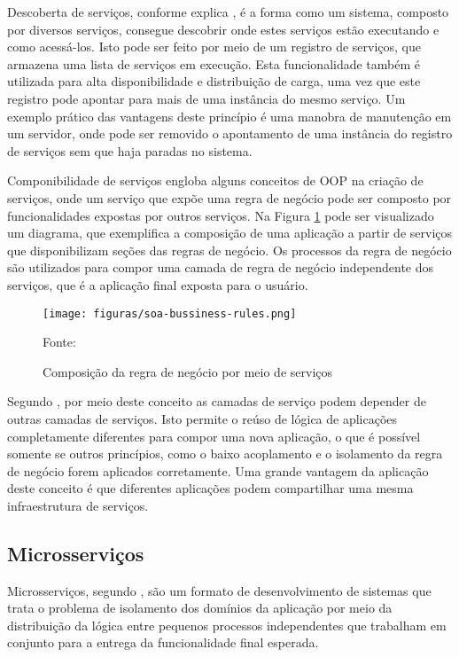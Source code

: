 Descoberta de serviços, conforme explica , é a
forma como um sistema, composto por diversos serviços, consegue descobrir onde
estes serviços estão executando e como acessá-los. Isto pode ser feito por
meio de um registro de serviços, que armazena uma lista de serviços
em execução. Esta funcionalidade também é utilizada para alta
disponibilidade e distribuição de carga, uma vez que este registro pode
apontar para mais de uma instância do mesmo serviço. Um exemplo prático das
vantagens deste princípio é uma manobra de manutenção em um servidor, onde
pode ser removido o apontamento de uma instância do registro de serviços sem
que haja paradas no sistema.

Componibilidade de serviços engloba alguns conceitos de \ac{OOP} na criação
de serviços, onde um serviço que expõe uma regra de negócio pode ser composto
por funcionalidades expostas por outros serviços. Na Figura
\ref{fig:soa-bussiness-rules} pode ser visualizado um diagrama, que exemplifica
a composição de uma aplicação a partir de serviços que disponibilizam seções
das regras de negócio. Os processos da regra de negócio são utilizados para
compor uma camada de regra de negócio independente dos serviços, que é a
aplicação final exposta para o usuário.

\begin{figure}[H]
	\centering
	\caption{Composição da regra de negócio por meio de serviços}
	\texttt{[image: figuras/soa-bussiness-rules.png]}

	\label{fig:soa-bussiness-rules}
	\footnotesize Fonte: 
\end{figure}

Segundo , por meio deste conceito as camadas de serviço
podem depender de outras camadas de serviços. Isto permite o reúso de lógica
de aplicações completamente diferentes para compor uma nova aplicação, o que
é possível somente se outros princípios, como o baixo acoplamento e o
isolamento da regra de negócio forem aplicados corretamente. Uma grande
vantagem da aplicação deste conceito é que diferentes aplicações podem
compartilhar uma mesma infraestrutura de serviços.

\subsection{Microsserviços}

Microsserviços, segundo , são um formato de
desenvolvimento de sistemas que trata o problema de isolamento dos domínios
da aplicação por meio da distribuição da lógica entre pequenos processos
independentes que trabalham em conjunto para a entrega da funcionalidade
final esperada.

